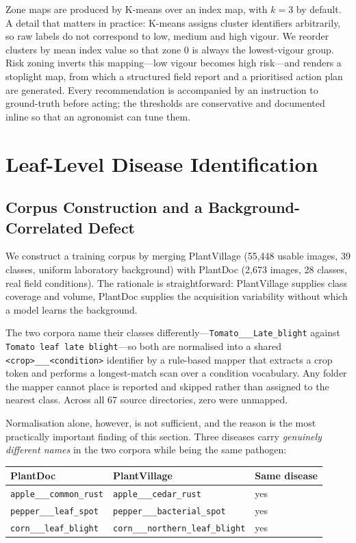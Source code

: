\documentclass[conference]{IEEEtran}
\begin{document}
Zone maps are produced by K-means \cite{macqueen1967} over an index map, with
$k=3$ by default. A detail that matters in practice: K-means assigns cluster
identifiers arbitrarily, so raw labels do not correspond to low, medium and
high vigour. We reorder clusters by mean index value so that zone $0$ is always
the lowest-vigour group. Risk zoning inverts this mapping---low vigour becomes
high risk---and renders a stoplight map, from which a structured field report
and a prioritised action plan are generated. Every recommendation is
accompanied by an instruction to ground-truth before acting; the thresholds are
conservative and documented inline so that an agronomist can tune them.

\section{Leaf-Level Disease Identification}

\subsection{Corpus Construction and a Background-Correlated Defect}

We construct a training corpus by merging PlantVillage \cite{hughes2015}
(55{,}448 usable images, 39 classes, uniform laboratory background) with
PlantDoc \cite{singh2020} (2{,}673 images, 28 classes, real field conditions).
The rationale is straightforward: PlantVillage supplies class coverage and
volume, PlantDoc supplies the acquisition variability without which a model
learns the background.

The two corpora name their classes differently---\texttt{Tomato\_\_\_Late\_blight}
against \texttt{Tomato leaf late blight}---so both are normalised into a shared
\texttt{<crop>\_\_\_<condition>} identifier by a rule-based mapper that extracts
a crop token and performs a longest-match scan over a condition vocabulary. Any
folder the mapper cannot place is reported and skipped rather than assigned to
the nearest class. Across all 67 source directories, zero were unmapped.

Normalisation alone, however, is not sufficient, and the reason is the most
practically important finding of this section. Three diseases carry
\emph{genuinely different names} in the two corpora while being the same
pathogen:

\begin{center}\footnotesize
\begin{tabular}{@{}lll@{}}
\toprule
PlantDoc & PlantVillage & Same disease \\
\midrule
\texttt{apple\_\_\_common\_rust}  & \texttt{apple\_\_\_cedar\_rust} & yes \\
\texttt{pepper\_\_\_leaf\_spot}   & \texttt{pepper\_\_\_bacterial\_spot} & yes \\
\texttt{corn\_\_\_leaf\_blight}   & \texttt{corn\_\_\_northern\_leaf\_blight} & yes \\
\bottomrule
\end{tabular}
\end{center}
\end{document}
